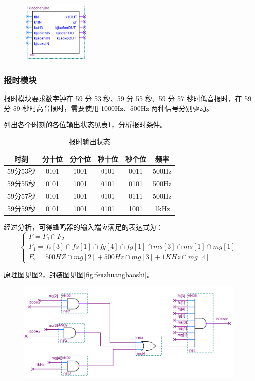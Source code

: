 \documentclass[12pt]{article}
\begin{document}
\begin{figure}[hp]
	\centering  
	\includegraphics[width=0.3\textwidth]{picture/fenzhuangxiaochan.png} 
	\caption{}
	\label{fig:fenzhuangxiaochan}   
\end{figure}\par
\subsubsection{报时模块}
报时模块要求数字钟在 59 分 53 秒、59 分 55 秒、59 分 57 秒时低音报时，在 59 分 59 秒时高音报时，需要使用 1000Hz、500Hz 两种信号分别驱动。\par
列出各个时刻的各位输出状态见表\ref{tab:baoshi}，分析报时条件。\par
\begin{table}[htbp]
  \centering
  \caption{报时输出状态}\label{tab:baoshi}
    \begin{tabular}{cccccc}
    \hline
    时刻 & 分十位 & 分个位 & 秒十位 & 秒个位 & 频率 \\
    \hline
    59分53秒 & 0101 & 1001 & 0101 & 0011 & 500Hz \\
    59分55秒 & 0101 & 1001 & 0101 & 0101 & 500Hz \\
    59分57秒 & 0101 & 1001 & 0101 & 0111 & 500Hz \\
    59分59秒 & 0101 & 1001 & 0101 & 1001 & 1kHz \\
    \hline
    \end{tabular}%
\end{table}%
经过分析，可得蜂鸣器的输入端应满足的表达式为：$$\left\{
             \begin{array}{c}
             F=F_1\cap F_2\\
             F_1=fs[3]\cap fs[1]\cap fg[4]\cap fg[1]\cap ms[3]\cap ms[1]\cap mg[1]\\
             F_2=500HZ\cap mg[2]+500Hz\cap mg[3]+1KHz\cap mg[4]
             \end{array}
\right.$$\par 原理图见图\ref{fig:baoshi}，封装图见图\ref{fig:fenzhuangbaoshi}。
\begin{figure}[hp]
	\centering  
	\includegraphics[width=\textwidth]{picture/baoshi.png} 
	\caption{}
	\label{fig:baoshi}   
\end{figure}
\end{document}

